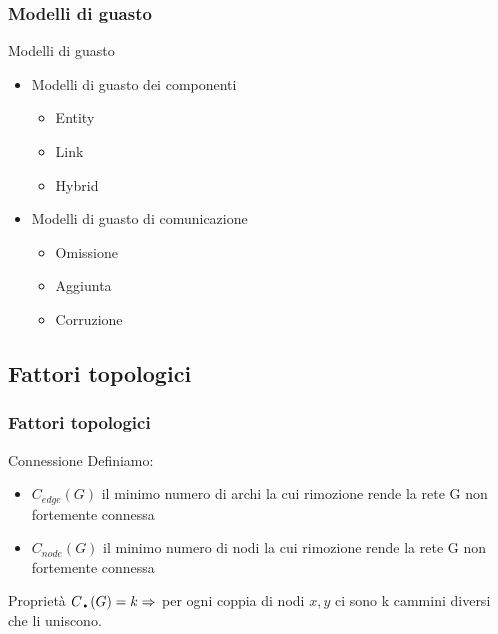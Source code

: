 		\begin{frame}
			\frametitle{Modelli di guasto}
			\begin{block}{Modelli di guasto}
				\begin{itemize}
					\item Modelli di guasto dei componenti
					\begin{itemize}
						\footnotesize
						\item Entity
						\item Link
						\item Hybrid
					\end{itemize}
					\item Modelli di guasto di comunicazione
					\begin{itemize}
						\footnotesize
						\item Omissione
						\item Aggiunta
						\item Corruzione
					\end{itemize}
				\end{itemize}
			\end{block}
		\end{frame}
	
	\subsection{Fattori topologici}
	
		\begin{frame}
			\frametitle{Fattori topologici}
			\begin{block}{Connessione}
				Definiamo:
				\begin{itemize}
					\item $C_{edge}(G)$ il minimo numero di archi la cui rimozione rende la rete G non fortemente connessa
					\item $C_{node}(G)$ il minimo numero di nodi la cui rimozione rende la rete G non fortemente connessa
				\end{itemize}
			\end{block}
			\begin{block}{Proprietà}
				$C_{\text{\textbullet}}(G) = k \Rightarrow$ per ogni coppia di nodi $x,y$ ci sono k cammini diversi che li uniscono.
			\end{block}
		\end{frame}
	
